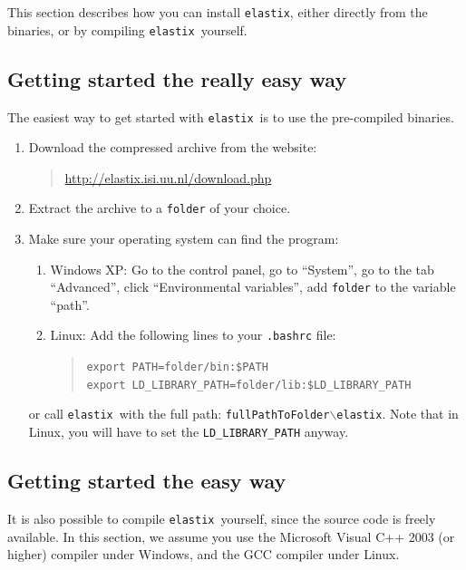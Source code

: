 \documentclass[]{report}
\newcommand{\elastix}{\texttt{elastix}}
\begin{document}
This section describes how you can install \elastix, either directly
from the binaries, or by compiling \elastix\ yourself.

\subsection{Getting started the really easy way}

The easiest way to get started with \elastix\ is to use the
pre-compiled binaries.
\begin{enumerate}
\item Download the compressed archive from the website:
    \begin{quote}
    \url{http://elastix.isi.uu.nl/download.php}
    \end{quote}

\item Extract the archive to a \texttt{folder} of your choice.

\item Make sure your operating system can find the program:
    \begin{enumerate}
    \item Windows XP: Go to the control panel, go to ``System'', go to
    the tab ``Advanced'', click ``Environmental variables'', add \texttt{folder}
    to the variable ``path''.

    \item Linux: Add the following lines to your \texttt{.bashrc} file:
       \begin{quote}
       \texttt{export PATH=folder/bin:\$PATH}\\
       \texttt{export LD\_LIBRARY\_PATH=folder/lib:\$LD\_LIBRARY\_PATH}
       \end{quote}
    \end{enumerate}
    or call \elastix\ with the full path:
    \texttt{fullPathToFolder$\backslash$elastix}. Note that in Linux, you
    will have to set the \texttt{LD\_LIBRARY\_PATH} anyway.
\end{enumerate}

\subsection{Getting started the easy way}

It is also possible to compile \elastix\ yourself, since the source code is
freely available. In this section, we assume you use the Microsoft Visual C++
2003 (or higher) compiler under Windows, and the GCC compiler under Linux.
\end{document}
